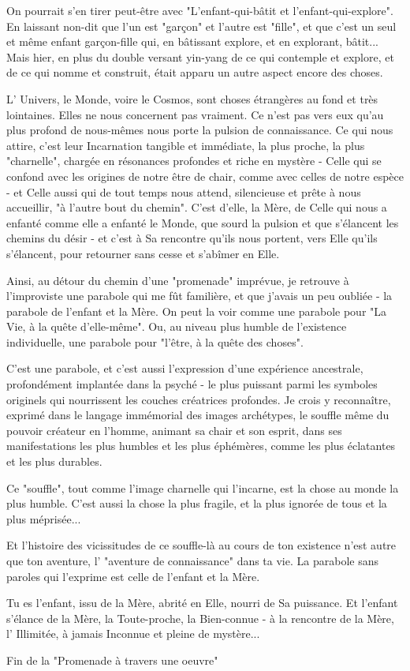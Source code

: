 On pourrait s'en tirer peut-être avec "L'enfant-qui-bâtit et l'enfant-qui-explore". En laissant non-dit que l'un est "garçon" et l'autre est "fille", et que c'est un seul et même enfant garçon-fille qui, en bâtissant explore, et en explorant, bâtit... Mais hier, en plus du double versant yin-yang de ce qui contemple et explore, et de ce qui nomme et construit, était apparu un autre aspect encore des choses.

L' Univers, le Monde, voire le Cosmos, sont choses étrangères au fond et très lointaines. Elles ne nous concernent pas vraiment. Ce n'est pas vers eux qu'au plus profond de nous-mêmes nous porte la pulsion de connaissance. Ce qui nous attire, c'est leur Incarnation tangible et immédiate, la plus proche, la plus "charnelle", chargée en résonances profondes et riche en mystère - Celle qui se confond avec les origines de notre être de chair, comme avec celles de notre espèce - et Celle aussi qui de tout temps nous attend, silencieuse et prête à nous accueillir, "à l'autre bout du chemin". C'est d'elle, la Mère, de Celle qui nous a enfanté comme elle a enfanté le Monde, que sourd la pulsion et que s'élancent les chemins du désir - et c'est à Sa rencontre qu'ils nous portent, vers Elle qu'ils s'élancent, pour retourner sans cesse et s'abîmer en Elle.

Ainsi, au détour du chemin d'une "promenade" imprévue, je retrouve à l'improviste une parabole qui me fût familière, et que j'avais un peu oubliée - la parabole de l'enfant et la Mère. On peut la voir comme une parabole pour "La Vie, à la quête d'elle-même". Ou, au niveau plus humble de l'existence individuelle, une parabole pour "l'être, à la quête des choses".

C'est une parabole, et c'est aussi l'expression d'une expérience ancestrale, profondément implantée dans la psyché - le plus puissant parmi les symboles originels qui nourrissent les couches créatrices profondes. Je crois y reconnaître, exprimé dans le langage immémorial des images archétypes, le souffle même du pouvoir créateur en l'homme, animant sa chair et son esprit, dans ses manifestations les plus humbles et les plus éphémères, comme les plus éclatantes et les plus durables.

Ce "souffle", tout comme l'image charnelle qui l'incarne, est la chose au monde la plus humble. C'est aussi la chose la plus fragile, et la plus ignorée de tous et la plus méprisée...

Et l'histoire des vicissitudes de ce souffle-là au cours de ton existence n'est autre que ton aventure, l' "aventure de connaissance" dans ta vie. La parabole sans paroles qui l'exprime est celle de l'enfant et la Mère.

Tu es l'enfant, issu de la Mère, abrité en Elle, nourri de Sa puissance. Et l'enfant s'élance de la Mère, la Toute-proche, la Bien-connue - à la rencontre de la Mère, l' Illimitée, à jamais Inconnue et pleine de mystère...

\hfill Fin de la "Promenade à travers une oeuvre"


